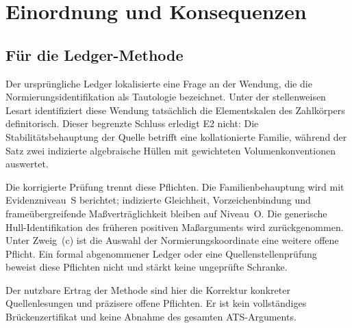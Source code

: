 \documentclass[11pt,a4paper]{article}
\theoremstyle{definition}
\theoremstyle{plain}
\theoremstyle{definition}
\begin{document}
\section{Einordnung und Konsequenzen}
\label{sec:assessment}

\subsection{Für die Ledger-Methode}

Der ursprüngliche Ledger lokalisierte eine Frage an der Wendung, die
die Normierungsidentifikation als Tautologie bezeichnet. Unter der
stellenweisen Lesart identifiziert diese Wendung tatsächlich die
Elementskalen des Zahlkörpers definitorisch. Dieser begrenzte Schluss
erledigt E2 nicht: Die Stabilitätsbehauptung der Quelle betrifft eine
kollationierte Familie, während der Satz zwei indizierte algebraische
Hüllen mit gewichteten Volumenkonventionen auswertet.

Die korrigierte Prüfung trennt diese Pflichten. Die Familienbehauptung wird
mit Evidenzniveau~S berichtet; indizierte Gleichheit, Vorzeichenbindung
und frameübergreifende Maßverträglichkeit bleiben auf Niveau~O.
Die generische Hull-Identifikation des früheren positiven Maßarguments
wird zurückgenommen. Unter Zweig~(c) ist die Auswahl der
Normierungskoordinate eine weitere offene Pflicht.
Ein formal abgenommener Ledger oder eine Quellenstellenprüfung beweist
diese Pflichten nicht und stärkt keine ungeprüfte Schranke.

Der nutzbare Ertrag der Methode sind hier die Korrektur konkreter
Quellenlesungen und präzisere offene Pflichten. Er ist kein vollständiges
Brückenzertifikat und keine Abnahme des gesamten ATS-Arguments.
\end{document}
